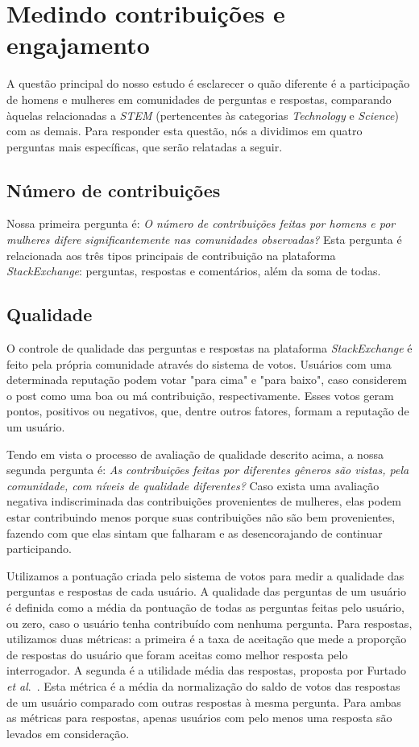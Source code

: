 \section{Medindo contribuições e engajamento}

A questão principal do nosso estudo é esclarecer o quão diferente é a participação de homens e mulheres em comunidades de perguntas e respostas, comparando àquelas relacionadas a \emph{STEM} (pertencentes às categorias \emph{Technology} e \emph{Science}) com as demais. Para responder esta questão, nós a dividimos em quatro perguntas mais específicas, que serão relatadas a seguir.

\subsection{Número de contribuições}

Nossa primeira pergunta é: \textit{O número de contribuições feitas por homens e por mulheres difere significantemente nas comunidades observadas?} Esta pergunta é relacionada aos três tipos principais de contribuição na plataforma \emph{StackExchange}: perguntas, respostas e comentários, além da soma de todas.

\subsection{Qualidade}

O controle de qualidade das perguntas e respostas na plataforma \emph{StackExchange} é feito pela própria comunidade através do sistema de votos. Usuários com uma determinada reputação podem votar "para cima" e "para baixo", caso considerem o post como uma boa ou má contribuição, respectivamente. Esses votos geram pontos, positivos ou negativos, que, dentre outros fatores, formam a reputação de um usuário. 

Tendo em vista o processo de avaliação de qualidade descrito acima, a nossa segunda pergunta é: \textit{As contribuições feitas por diferentes gêneros são vistas, pela comunidade, com níveis de qualidade diferentes?} Caso exista uma avaliação negativa indiscriminada das contribuições provenientes de mulheres, elas podem estar contribuindo menos porque suas contribuições não são bem provenientes, fazendo com que elas sintam que falharam e as desencorajando de continuar participando. 

Utilizamos a pontuação criada pelo sistema de votos para medir a qualidade das perguntas e respostas de cada usuário. A qualidade das perguntas de um usuário é definida como a média da pontuação de todas as perguntas feitas pelo usuário, ou zero, caso o usuário tenha contribuído com nenhuma pergunta. Para respostas, utilizamos duas métricas: a primeira é a taxa de aceitação que mede a proporção de respostas do usuário que foram aceitas como melhor resposta pelo interrogador. A segunda é a utilidade média das respostas, proposta por Furtado \textit{et al}.~\cite{furtado2013contributor}. Esta métrica é a média da normalização do saldo de votos das respostas de um usuário comparado com outras respostas à mesma pergunta. Para ambas as métricas para respostas, apenas usuários com pelo menos uma resposta são levados em consideração.

